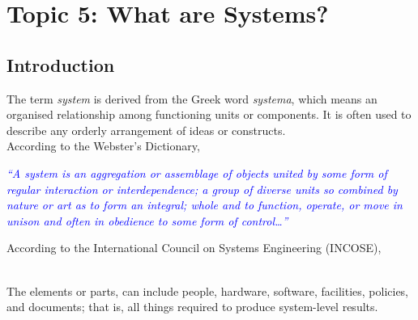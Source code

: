 \documentclass[../notes-main.tex]{subfiles}
\begin{document}
\section{Topic 5: What are Systems?}
\subsection{Introduction}
The term \emph{system} is derived from the Greek word \emph{systema}, which means an organised relationship among functioning units or components. It is often used to describe any orderly arrangement of ideas or constructs.\\
According to the Webster's Dictionary,
\begin{mdframed}
    \begin{center}
        \textcolor{blue}{%
            \emph{``A system is an aggregation or assemblage of objects united by some form of regular interaction or interdependence; a group of diverse units so combined by nature or art as to form an integral; whole and to function, operate, or move in unison and often in obedience to some form of control\dots''}}
    \end{center}
\end{mdframed}\label{fig:system-def-webster}
\noindent According to the International Council on Systems Engineering (INCOSE),
\begin{mdframed}
    \begin{center}
        \\ The elements or parts, can include people, hardware, software, facilities, policies, and documents; that is, all things required to produce system-level results.
    \end{center}
\end{mdframed}\label{fig:system-def-incose}
\end{document}
